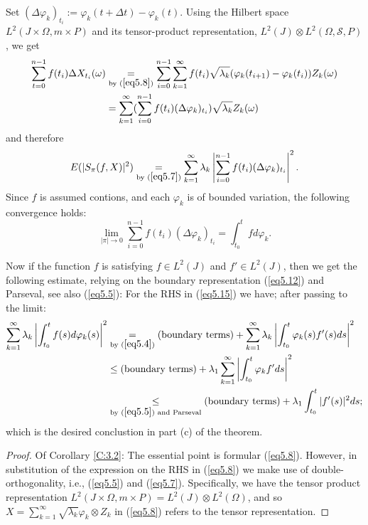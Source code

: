 \documentclass{amsart}
\theoremstyle{definition}
\theoremstyle{remark}
\numberwithin{equation}{section}
\begin{document}
Set $(\Delta \varphi_{k})_{t_{i}}:=\varphi_{k}(t+\Delta t)-\varphi_{k}(t)$.
Using the Hilbert space $L^{2}(J \times \Omega, m \times P)$ and its 
tensor-product representation, 
$L^{2}(J)\otimes L^{2}(\Omega, \mathcal{S}, P)$, we get 
\begin{align*}
  \sum_{t=0}^{n-1}f(t_{i})\Delta X_{t_{i}}(\omega) 
  &\underset{\text{by } (\ref{eq5.8})}{=} 
  \sum_{i=0}^{n-1}\sum_{k=1}^{\infty}f(t_{i})\sqrt{\lambda_{k}}
  (\varphi_{k}(t_{i+1})-\varphi_{k}(t_{i}))Z_{k}(\omega) \\
  &= \sum_{k=1}^{\infty}(\sum_{i=0}^{n-1}f(t_{i})(\Delta \varphi_{k})_{t_{i}})
     \sqrt{\lambda_{k}}Z_{k}(\omega)\\
\end{align*}
and therefore
\begin{equation}
\label{eq5.15}
  E(|S_{\pi}(f, X)|^{2}) \underset{\text{by } (\ref{eq5.7})}{=}
  \sum_{k=1}^{\infty}\lambda_{k}\left\vert 
  \sum_{i=0}^{n-1} f(t_{i})(\Delta \varphi_{k})_{t_{i}} \right\vert^{2}.
\end{equation}
Since $f$ is assumed contions, and each $\varphi_{k}$ is of bounded variation, 
the following convergence holds:
\begin{equation}
\label{eq5.16}
  \lim_{|\pi|\to 0} \sum_{i=0}^{n-1}f(t_{i})(\Delta \varphi_{k})_{t_{i}} 
  = \int_{t_{0}}^{t}fd\varphi_{k}.
\end{equation}

Now if the function $f$ is satisfying $f \in L^{2}(J)$ and $f' \in L^{2}(J)$, 
then we get the following estimate, relying on the boundary representation 
(\ref{eq5.12}) and Parseval, see also (\ref{eq5.5}): For the RHS 
in (\ref{eq5.15}) 
we have; after passing to the limit:
\begin{align*}
  \sum_{k=1}^{\infty}\lambda_{k} \left\vert 
  \int_{t_{0}}^{t}f(s)d\varphi_{k}(s)\right\vert^{2} 
  &\underset{\text{by } (\ref{eq5.4})}{=}
  \text{(boundary terms)} + \sum_{k=1}^{\infty}\lambda_{k} \left\vert 
  \int_{t_{0}}^{t}\varphi_{k}(s)f'(s)ds\right\vert^{2}  \\
  &\leq \text{(boundary terms)} + \lambda_{1}\sum_{k=1}^{\infty} \left\vert 
  \int_{t_{0}}^{t}\varphi_{k}f'ds\right\vert^{2}  \\
  &\underset{\text{by } (\ref{eq5.5}) \text{ and Parseval}}{\leq}
  \text{(boundary terms)} + \lambda_{1} \int_{t_{0}}^{t}|f'(s)|^{2}ds;
\end{align*}
which is the desired conclustion in part (c) of the theorem.

\begin{proof}
Of Corollary \ref{C:3.2}: The essential point is formular (\ref{eq5.8}).  
However, in substitution of the expression on the RHS in (\ref{eq5.8}) we 
make use of double-orthogonality, i.e., (\ref{eq5.5}) and (\ref{eq5.7}). 
Specifically, we have the tensor product representation
$L^{2}(J \times \Omega, m \times P)=L^{2}(J) \otimes L^{2}(\Omega)$,
and so $X=\sum_{k=1}^{\infty}\sqrt{\lambda_{k}}\varphi_{k} \otimes Z_{k}$
in (\ref{eq5.8}) refers to the tensor representation.
\end{proof}
\end{document}
